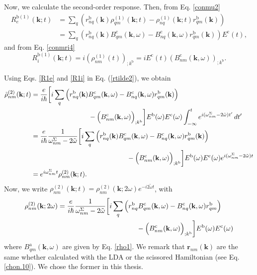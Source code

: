 Now, we calculate the second-order response. Then, from Eq. \eqref{conmu2}
\begin{align}\label{R1e}
R_e^{\mathrm{b}(1)}(\mathbf{k};t)
&=
\sum_{q}
\left(
r^{\mathrm{b}}_{nq}(\mathbf{k})
\rho^{(1)}_{q m}(\mathbf{k};t)
-
\rho^{(1)}_{nq}(\mathbf{k};t)
r^{\mathrm{b}}_{q m}(\mathbf{k})
\right)
\nonumber \\
&=
\sum_{q}
\left(
r^{\mathrm{b}}_{nq}(\mathbf{k})
B^{\mathrm{c}}_{q m}(\mathbf{k},\omega)
-
B^{\mathrm{c}}_{nq}(\mathbf{k},\omega)
r^{\mathrm{b}}_{q m}(\mathbf{k})
\right)E^{\mathrm{c}}(t)
,
\end{align}
and from Eq. \eqref{conmri4}
\begin{equation}\label{R1i}
R_{i}^{\mathrm{b}(1)}(\mathbf{k};t)=
i(\rho^{(1)}_{nm}(t))_{;k^{\mathrm{b}}}=
iE^{\mathrm{c}}(t)(B^{\mathrm{c}}_{nm}(\mathbf{k},\omega))_{;k^{\mathrm{b}}}.
\end{equation}

Using Eqs. \eqref{R1e} and  \eqref{R1i} in Eq. (\ref{rtilde2}), we obtain
\begin{align}\label{rtilde33}
\tilde{\rho}^{(2)}_{nm}(\mathbf{k};t)
&=
\frac{e}{i\hbar}
\bigg[
i\sum_{q}
\Big(
  r^{\mathrm{b}}_{nq}(\mathbf{k})B^{\mathrm{c}}_{q m}(\mathbf{k},\omega)
- B^{\mathrm{c}}_{nq}(\mathbf{k},\omega)r^{\mathrm{b}}_{q m}(\mathbf{k})
\Big)\nonumber\\
&\hspace*{3cm}- \Big(B^{\mathrm{c}}_{nm}(\mathbf{k},\omega)\Big)_{;k^{\mathrm{b}}}
\bigg]
E^{\mathrm{b}}(\omega)E^{\mathrm{c}}(\omega)
\int_{-\infty}^{t} e^{i(\omega^\Sigma_{nm}-2\tilde{\omega})t'}\,dt'\nonumber \\
&= \frac{e}{i\hbar}
\frac{1}{\omega^\Sigma_{nm}-2\tilde{\omega}}
\bigg[
i\sum_{q}
\Big(
  r^{\mathrm{b}}_{nq}(\mathbf{k})B^{\mathrm{c}}_{q m}(\mathbf{k},\omega)
- B^{\mathrm{c}}_{nq}(\mathbf{k},\omega)r^{\mathrm{b}}_{q m}(\mathbf{k})
\Big)\nonumber\\
&\hspace*{5cm}- \Big(B^{\mathrm{c}}_{nm}(\mathbf{k},\omega)\Big)_{;k^{\mathrm{b}}}
\bigg]
E^{\mathrm{b}}(\omega)E^{\mathrm{c}}(\omega)
e^{i(\omega^\Sigma_{nm}-2\tilde{\omega})t}
\nonumber \\
&= e^{i\omega^\Sigma_{nm}t}\rho_{nm}^{(2)}(\mathbf{k};t).
\end{align}
Now, we write
$\rho_{nm}^{(2)}(\mathbf{k};t)=\rho_{nm}^{(2)}(\mathbf{k};2\omega)e^{-i2\tilde{\omega}t}$,
with
\begin{align}\label{rho2}
\rho_{nm}^{(2)}(\mathbf{k};2\omega)&=\frac{e}{i\hbar}\frac{1}{\omega^\Sigma_{nm}-2\tilde{\omega}}
\bigg[
i\sum_q
\Big(
  r_{nq}^{\mathrm{b}}B_{q m}^{\mathrm{c}}(\mathbf{k},\omega)
- B_{nq}^{\mathrm{c}}(\mathbf{k},\omega)r_{q m}^{\mathrm{b}}
  \Big)\nonumber\\
&\hspace*{4cm}- \Big(B_{nm}^{\mathrm{c}}(\mathbf{k},\omega)\Big)_{;k^{\mathrm{b}}}
\bigg] 
E^{\mathrm{b}}(\omega)E^{\mathrm{c}}(\omega)
\end{align} 
where $B_{q m}^{\mathrm{a}}(\mathbf{k},\omega)$ are given by Eq.
\eqref{rho1}. We remark that $\mathbf{r}_{nm}(\mathbf{k})$  are the same whether
calculated with the LDA or the scissored Hamiltonian (see Eq. \eqref{chon.10}).
We chose the former in this thesis.

